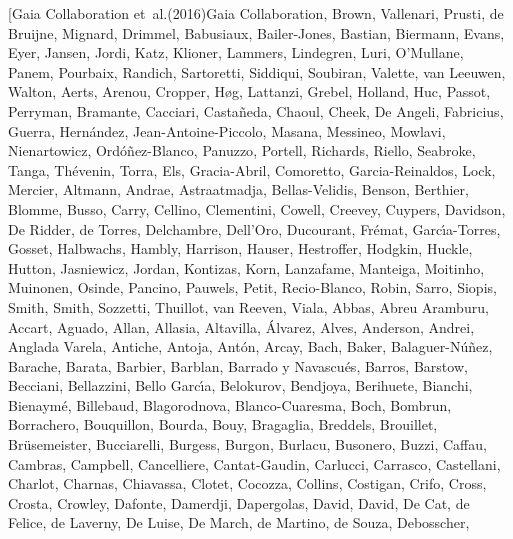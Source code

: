 \documentclass{aa}
\begin{document}
\begin{thebibliography}{242}
\bibitem[{{Gaia Collaboration} {et~al.}(2016{}){Gaia
  Collaboration}, {Brown}, {Vallenari}, {Prusti}, {de Bruijne}, {Mignard},
  {Drimmel}, {Babusiaux}, {Bailer-Jones}, {Bastian}, {Biermann}, {Evans},
  {Eyer}, {Jansen}, {Jordi}, {Katz}, {Klioner}, {Lammers}, {Lindegren}, {Luri},
  {O'Mullane}, {Panem}, {Pourbaix}, {Randich}, {Sartoretti}, {Siddiqui},
  {Soubiran}, {Valette}, {van Leeuwen}, {Walton}, {Aerts}, {Arenou}, {Cropper},
  {H{\o}g}, {Lattanzi}, {Grebel}, {Holland}, {Huc}, {Passot}, {Perryman},
  {Bramante}, {Cacciari}, {Casta{\~n}eda}, {Chaoul}, {Cheek}, {De Angeli},
  {Fabricius}, {Guerra}, {Hern{\'a}ndez}, {Jean-Antoine-Piccolo}, {Masana},
  {Messineo}, {Mowlavi}, {Nienartowicz}, {Ord{\'o}{\~n}ez-Blanco}, {Panuzzo},
  {Portell}, {Richards}, {Riello}, {Seabroke}, {Tanga}, {Th{\'e}venin},
  {Torra}, {Els}, {Gracia-Abril}, {Comoretto}, {Garcia-Reinaldos}, {Lock},
  {Mercier}, {Altmann}, {Andrae}, {Astraatmadja}, {Bellas-Velidis}, {Benson},
  {Berthier}, {Blomme}, {Busso}, {Carry}, {Cellino}, {Clementini}, {Cowell},
  {Creevey}, {Cuypers}, {Davidson}, {De Ridder}, {de Torres}, {Delchambre},
  {Dell'Oro}, {Ducourant}, {Fr{\'e}mat}, {Garc{\'{\i}}a-Torres}, {Gosset},
  {Halbwachs}, {Hambly}, {Harrison}, {Hauser}, {Hestroffer}, {Hodgkin},
  {Huckle}, {Hutton}, {Jasniewicz}, {Jordan}, {Kontizas}, {Korn}, {Lanzafame},
  {Manteiga}, {Moitinho}, {Muinonen}, {Osinde}, {Pancino}, {Pauwels}, {Petit},
  {Recio-Blanco}, {Robin}, {Sarro}, {Siopis}, {Smith}, {Smith}, {Sozzetti},
  {Thuillot}, {van Reeven}, {Viala}, {Abbas}, {Abreu Aramburu}, {Accart},
  {Aguado}, {Allan}, {Allasia}, {Altavilla}, {{\'A}lvarez}, {Alves},
  {Anderson}, {Andrei}, {Anglada Varela}, {Antiche}, {Antoja}, {Ant{\'o}n},
  {Arcay}, {Bach}, {Baker}, {Balaguer-N{\'u}{\~n}ez}, {Barache}, {Barata},
  {Barbier}, {Barblan}, {Barrado y Navascu{\'e}s}, {Barros}, {Barstow},
  {Becciani}, {Bellazzini}, {Bello Garc{\'{\i}}a}, {Belokurov}, {Bendjoya},
  {Berihuete}, {Bianchi}, {Bienaym{\'e}}, {Billebaud}, {Blagorodnova},
  {Blanco-Cuaresma}, {Boch}, {Bombrun}, {Borrachero}, {Bouquillon}, {Bourda},
  {Bouy}, {Bragaglia}, {Breddels}, {Brouillet}, {Br{\"u}semeister},
  {Bucciarelli}, {Burgess}, {Burgon}, {Burlacu}, {Busonero}, {Buzzi}, {Caffau},
  {Cambras}, {Campbell}, {Cancelliere}, {Cantat-Gaudin}, {Carlucci},
  {Carrasco}, {Castellani}, {Charlot}, {Charnas}, {Chiavassa}, {Clotet},
  {Cocozza}, {Collins}, {Costigan}, {Crifo}, {Cross}, {Crosta}, {Crowley},
  {Dafonte}, {Damerdji}, {Dapergolas}, {David}, {David}, {De Cat}, {de Felice},
  {de Laverny}, {De Luise}, {De March}, {de Martino}, {de Souza}, {Debosscher},
}
\end{thebibliography}
\end{document}
